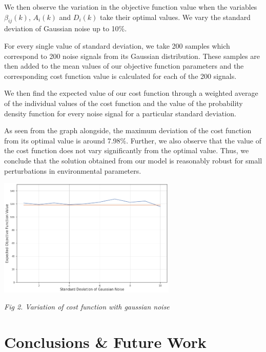 \documentclass[conference]{IEEEtran}
\begin{document}
We then observe the variation in the objective function value when the variables $\beta_{ij}(k)$, $A_i(k)$ and $D_i(k)$ take their optimal values. We vary the standard deviation of Gaussian noise up to 10\%.
\vspace{2mm}

For every single value of standard deviation, we take 200 samples which correspond to 200 noise signals from its Gaussian distribution. These samples are then added to the mean values of our objective function parameters and the corresponding cost function value is calculated for each of the 200 signals.
\vspace{2mm}

We then find the expected value of our cost function through a weighted average of the individual values of the cost function and the value of the probability density function for every noise signal for a particular standard deviation.
\vspace{2mm}

As seen from the graph alongside, the maximum deviation of the cost function from its optimal value is around 7.98\%. Further, we also observe that the value of the cost function does not vary significantly from the optimal value. Thus, we conclude that the solution obtained from our model is reasonably robust for small perturbations in environmental parameters.

\begin{center}
    \centerline{\includegraphics[width=8.5cm]{uncertainty_analysis.png}}
    \textit{Fig 2. Variation of cost function with gaussian noise}
\end{center}

\section{\large Conclusions \& Future Work}
\label{sec:sec7}
\vspace{1mm}
\end{document}
